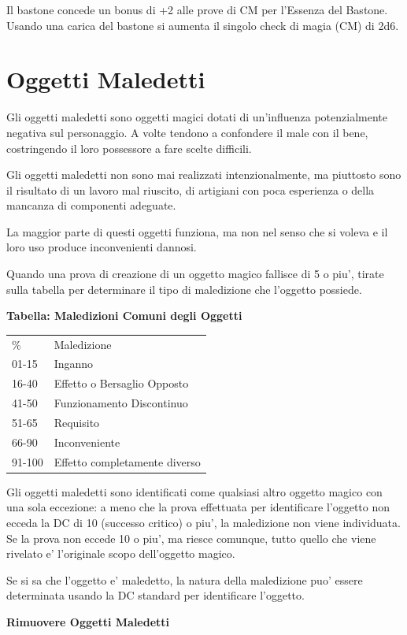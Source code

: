 \documentclass[a4paper,11pt,twoside,openany]{dndbook}
\begin{document}
{Il bastone concede un bonus di +2 alle prove di CM per l'Essenza del Bastone. Usando una carica del bastone si aumenta il singolo check di magia (CM) di 2d6.

\pagebreak

\section{Oggetti Maledetti}

\label{oggetti-maledetti}

Gli oggetti maledetti sono oggetti magici dotati di un'influenza potenzialmente negativa sul personaggio. A volte tendono a confondere il male con il bene, costringendo il loro possessore a fare scelte difficili. 

Gli oggetti maledetti non sono mai realizzati intenzionalmente, ma piuttosto sono il risultato di un lavoro mal riuscito, di artigiani con poca esperienza o della mancanza di componenti adeguate.

La maggior parte di questi oggetti funziona, ma non nel senso che si voleva e il loro uso produce inconvenienti dannosi.

Quando una prova di creazione di un oggetto magico fallisce di 5 o piu', tirate sulla tabella per determinare il tipo di maledizione che l'oggetto possiede.

\textbf{Tabella: Maledizioni Comuni degli Oggetti}

\begin{tabular}[c]{@{}ll@{}}
\toprule 
\% & Maledizione\tabularnewline
01-15 & Inganno\tabularnewline
16-40 & Effetto o Bersaglio Opposto\tabularnewline
41-50 & Funzionamento Discontinuo\tabularnewline
51-65 & Requisito\tabularnewline
66-90 & Inconveniente\tabularnewline
91-100 & Effetto completamente diverso\tabularnewline
\bottomrule
\end{tabular}

Gli oggetti maledetti sono identificati come qualsiasi altro oggetto magico con una sola eccezione: a meno che la prova effettuata per identificare l'oggetto non ecceda la DC di 10 (successo critico) o piu', la maledizione non viene individuata. Se la prova non eccede 10 o piu', ma riesce comunque, tutto quello che viene rivelato e' l'originale scopo dell'oggetto magico.

Se si sa che l'oggetto e' maledetto, la natura della maledizione puo' essere determinata usando la DC standard per identificare l'oggetto. 

\textbf{Rimuovere Oggetti Maledetti}

}
\end{document}
